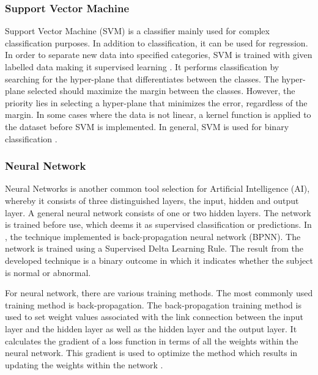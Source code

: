 \documentclass[11pt]{article}
\begin{document}
	\subsubsection{Support Vector Machine}
	Support Vector Machine (SVM) is a classifier mainly used for complex classification purposes. In addition to classification, it can be used for regression. In order to separate new data into specified categories, SVM is trained with given labelled data making it supervised learning \cite{saha_classifying_2016}. It performs classification by searching for the hyper-plane that differentiates between the classes. The hyper-plane selected should maximize the margin between the classes. However, the priority lies in selecting a hyper-plane that minimizes the error, regardless of the margin. 
	In some cases where the data is not linear, a kernel function is applied to the dataset before SVM is implemented. In general, SVM is used for binary classification \cite{Rebentrost2014}.
	
	\subsubsection{Neural Network}
	Neural Networks is another common tool selection for Artificial Intelligence (AI), whereby it consists of three distinguished layers, the input, hidden and output layer. A general neural network consists of one or two hidden layers. The network is trained before use, which deems it as supervised classification or predictions. In \cite{jyothi_congenital_2016}, the technique implemented is back-propagation neural network (BPNN). The network is trained using a Supervised Delta Learning Rule. The result from the developed technique is a binary outcome in which it indicates whether the subject is normal or abnormal.
	
	For neural network, there are various training methods. The most commonly used training method is back-propagation. The back-propagation training method is used to set weight values associated with the link connection between the input layer and the hidden layer as well as the hidden layer and the output layer. It calculates the gradient of a loss function in terms of all the weights within the neural network. This gradient is used to optimize the method which results in updating the weights within the network \cite{Oukrich2016}.
	
\end{document}
